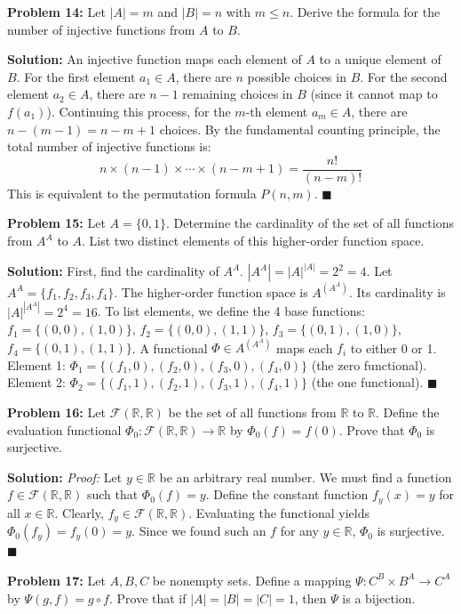 \documentclass[11pt, letterpaper]{article}
\theoremstyle{definition}
\theoremstyle{remark}
\newcommand{\R}{\mathbb{R}}
\newcommand{\F}{\mathcal{F}}
\begin{document}
\vspace{1em}
\textbf{Problem 14:} Let $|A| = m$ and $|B| = n$ with $m \le n$. Derive the formula for the number of injective functions from $A$ to $B$.

\textbf{Solution:}
An injective function maps each element of $A$ to a unique element of $B$. 
For the first element $a_1 \in A$, there are $n$ possible choices in $B$.
For the second element $a_2 \in A$, there are $n - 1$ remaining choices in $B$ (since it cannot map to $f(a_1)$).
Continuing this process, for the $m$-th element $a_m \in A$, there are $n - (m - 1) = n - m + 1$ choices.
By the fundamental counting principle, the total number of injective functions is:
\[ n \times (n - 1) \times \cdots \times (n - m + 1) = \frac{n!}{(n - m)!} \]
This is equivalent to the permutation formula $P(n, m)$. \hfill $\blacksquare$

\vspace{1em}
\textbf{Problem 15:} Let $A = \{0, 1\}$. Determine the cardinality of the set of all functions from $A^A$ to $A$. List two distinct elements of this higher-order function space.

\textbf{Solution:}
First, find the cardinality of $A^A$. $|A^A| = |A|^{|A|} = 2^2 = 4$. Let $A^A = \{f_1, f_2, f_3, f_4\}$.
The higher-order function space is $A^{(A^A)}$. Its cardinality is $|A|^{|A^A|} = 2^4 = 16$.
To list elements, we define the 4 base functions: $f_1 = \{(0,0), (1,0)\}$, $f_2 = \{(0,0), (1,1)\}$, $f_3 = \{(0,1), (1,0)\}$, $f_4 = \{(0,1), (1,1)\}$.
A functional $\Phi \in A^{(A^A)}$ maps each $f_i$ to either 0 or 1.
Element 1: $\Phi_1 = \{(f_1, 0), (f_2, 0), (f_3, 0), (f_4, 0)\}$ (the zero functional).
Element 2: $\Phi_2 = \{(f_1, 1), (f_2, 1), (f_3, 1), (f_4, 1)\}$ (the one functional). \hfill $\blacksquare$

\vspace{1em}
\textbf{Problem 16:} Let $\F(\R, \R)$ be the set of all functions from $\R$ to $\R$. Define the evaluation functional $\Phi_0: \F(\R, \R) \to \R$ by $\Phi_0(f) = f(0)$. Prove that $\Phi_0$ is surjective.

\textbf{Solution:}
\textit{Proof:} Let $y \in \R$ be an arbitrary real number. We must find a function $f \in \F(\R, \R)$ such that $\Phi_0(f) = y$. Define the constant function $f_y(x) = y$ for all $x \in \R$. Clearly, $f_y \in \F(\R, \R)$. Evaluating the functional yields $\Phi_0(f_y) = f_y(0) = y$. Since we found such an $f$ for any $y \in \R$, $\Phi_0$ is surjective. \hfill $\blacksquare$

\vspace{1em}
\textbf{Problem 17:} Let $A, B, C$ be nonempty sets. Define a mapping $\Psi: C^B \times B^A \to C^A$ by $\Psi(g, f) = g \circ f$. Prove that if $|A|=|B|=|C|=1$, then $\Psi$ is a bijection.
\end{document}
